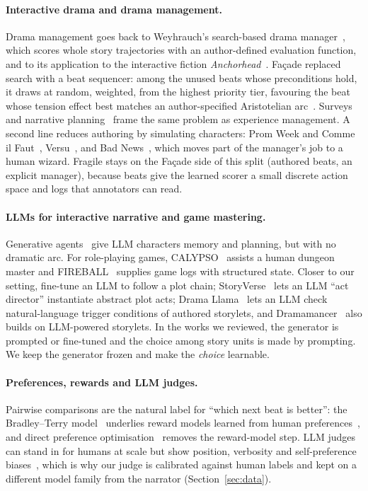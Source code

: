 \documentclass{article}
\newcommand{\fac}{Fa\c{c}ade}
\begin{document}
\paragraph{Interactive drama and drama management.}
Drama management goes back to Weyhrauch's search-based drama manager~\citep{weyhrauch1997guiding}, which scores whole story trajectories with an author-defined evaluation function, and to its application to the interactive fiction \emph{Anchorhead}~\citep{nelson2005searchbased}. \fac{} replaced search with a beat sequencer: among the unused beats whose preconditions hold, it draws at random, weighted, from the highest priority tier, favouring the beat whose tension effect best matches an author-specified Aristotelian arc~\citep{mateas2003facade,mateas2005structuring,mateas2002interactive}. Surveys~\citep{roberts2008survey,riedl2013interactive} and narrative planning~\citep{riedl2010narrative} frame the same problem as experience management. A second line reduces authoring by simulating characters: Prom Week and Comme il Faut~\citep{mccoy2011promweek,mccoy2014social}, Versu~\citep{evans2014versu}, and Bad News~\citep{ryan2016badnews}, which moves part of the manager's job to a human wizard. Fragile stays on the \fac{} side of this split (authored beats, an explicit manager), because beats give the learned scorer a small discrete action space and logs that annotators can read.

\paragraph{LLMs for interactive narrative and game mastering.}
Generative agents~\citep{park2023generative} give LLM characters memory and planning, but with no dramatic arc. For role-playing games, CALYPSO~\citep{zhu2023calypso} assists a human dungeon master and FIREBALL~\citep{zhu2023fireball} supplies game logs with structured state. Closer to our setting, \citet{wu2024roleplay} fine-tune an LLM to follow a plot chain; StoryVerse~\citep{wang2024storyverse} lets an LLM ``act director'' instantiate abstract plot acts; Drama Llama~\citep{sun2025dramallama} lets an LLM check natural-language trigger conditions of authored storylets, and Dramamancer~\citep{wang2025dramamancer} also builds on LLM-powered storylets. In the works we reviewed, the generator is prompted or fine-tuned and the choice among story units is made by prompting. We keep the generator frozen and make the \emph{choice} learnable.

\paragraph{Preferences, rewards and LLM judges.}
Pairwise comparisons are the natural label for ``which next beat is better'': the Bradley--Terry model~\citep{bradley1952rank} underlies reward models learned from human preferences~\citep{christiano2017deep,ouyang2022training}, and direct preference optimisation~\citep{rafailov2023direct} removes the reward-model step. LLM judges can stand in for humans at scale but show position, verbosity and self-preference biases~\citep{zheng2023judging}, which is why our judge is calibrated against human labels and kept on a different model family from the narrator (Section~\ref{sec:data}).
\end{document}
